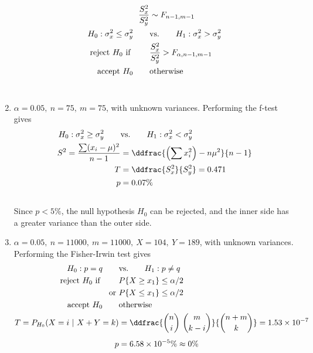 \begin{enumerate}
	\begin{align}
		\frac{S^2_x}{S^2_y} &\sim F_{n-1, m-1} \nonumber \\
		H_0 : \sigma_x^2 \leq \sigma_y^2 \qquad &\text{vs.} \qquad H_1 : \sigma_x^2 > \sigma_y^2 \nonumber \\
		\text{reject $ H_0 $ if } \qquad & \frac{S^2_x}{S^2_y} >  F_{\alpha, n-1, m-1} \nonumber \\
		\text{accept $ H_0 $} \qquad & \text{otherwise}
	\end{align}\\

	\item $\alpha = 0.05,\ n = 75,\ m = 75$, with unknown variances. Performing the f-test gives\\
	
	\begin{align}
		H_0 : \sigma_x^2 \geq \sigma_y^2 \qquad &\text{vs.} \qquad H_1 : \sigma_x^2 < \sigma_y^2 \nonumber \\
		S^2 = \frac{\sum (x_i - \mu)^2}{n-1} &= \ddfrac{\left(\sum x_i^2\right) - n\mu^2}{n-1} \nonumber \\
		T &= \ddfrac{ S^2_x }{S^2_y} = 0.471 \nonumber \\
		p &= 0.07\% 
	\end{align}\\
	
	Since $ p < 5\% $, the null hypothesis $ H_0 $ can be rejected, and the inner side has a greater variance than the outer side.\\
	
	\item $\alpha = 0.05,\ n = 11000,\ m = 11000,\ X = 104,\ Y = 189$, with unknown variances. Performing the Fisher-Irwin test gives\\
	
	\begin{align}
		H_0 : p  = q \qquad &\text{vs.} \qquad H_1 : p  \neq q \nonumber \\
		\text{reject $ H_0 $ if } \qquad & P\{X \geq x_1\} \leq \alpha/2  \nonumber \\
		\text{or }& P\{X \leq x_1\} \leq \alpha/2 \nonumber \\
		\text{accept $ H_0 $} \qquad & \text{otherwise} \nonumber \\
		T = P_{H_0}(X = i\ |\ X+Y = k) &= \ddfrac{\binom{n}{i}\ \binom{m}{k-i}}{\binom{n+m}{k}} = 1.53 \times 10^{-7} \nonumber \\[1ex]
		p &= 6.58 \times 10^{-5}\% \approx 0\%
	\end{align}\\
	

\end{enumerate}
